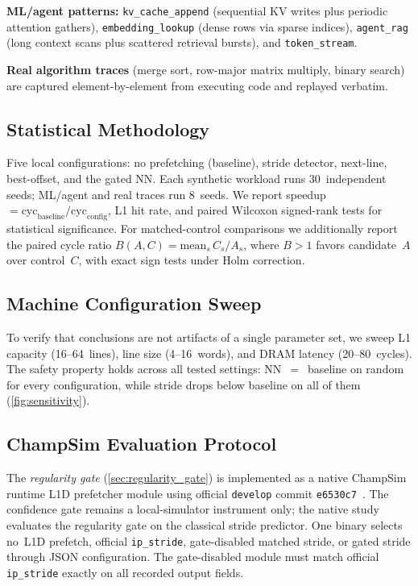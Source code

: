 \documentclass[conference]{IEEEtran}
\begin{document}
\textbf{ML/agent patterns:}
\texttt{kv\_cache\_append} (sequential KV writes plus periodic attention
gathers), \texttt{embedding\_lookup} (dense rows via sparse indices),
\texttt{agent\_rag} (long context scans plus scattered retrieval bursts),
and \texttt{token\_stream}.

\textbf{Real algorithm traces} (merge sort, row-major matrix multiply,
binary search) are captured element-by-element from executing code and
replayed verbatim.

\subsection{Statistical Methodology}

Five local configurations: no prefetching (baseline), stride detector,
next-line, best-offset, and the gated NN. Each synthetic workload runs
30~independent seeds; ML/agent and real traces run 8~seeds. We report
speedup $= \text{cyc}_\text{baseline} / \text{cyc}_\text{config}$, L1 hit
rate, and paired Wilcoxon signed-rank tests for statistical significance.
For matched-control comparisons we additionally report the paired cycle
ratio $B(A, C) = \text{mean}_s\, C_s / A_s$, where $B > 1$ favors
candidate~$A$ over control~$C$, with exact sign tests under Holm
correction.

\subsection{Machine Configuration Sweep}

To verify that conclusions are not artifacts of a single parameter set, we
sweep L1 capacity (16--64~lines), line size (4--16~words), and DRAM latency
(20--80~cycles). The safety property holds across all tested settings:
NN~$=$~baseline on random for every configuration, while stride drops below
baseline on all of them (\cref{fig:sensitivity}).

\subsection{ChampSim Evaluation Protocol}
\label{sec:champsim_protocol}

The \emph{regularity gate} (\cref{sec:regularity_gate}) is implemented as a native
ChampSim runtime L1D prefetcher module
using official \texttt{develop} commit \texttt{e6530c7}~\cite{champsim}.
The confidence gate remains a local-simulator instrument only; the native
study evaluates the regularity gate on the classical stride predictor.
One binary selects no~L1D prefetch, official \texttt{ip\_stride},
gate-disabled matched stride, or gated stride through JSON configuration.
The gate-disabled module must match official \texttt{ip\_stride} exactly on
all recorded output fields.
\end{document}
